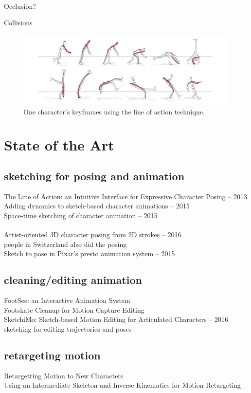 \documentclass[12pt, a4paper]{memoir}
\begin{document}
Occlusion?

Collisions

\begin{figure}
\includegraphics[scale=0.4]{img/baseline}
\caption{One character's keyframes using the line of action technique.}
\end{figure}

\section{State of the Art}
\subsection{sketching for posing and animation}
The Line of Action: an Intuitive Interface for Expressive Character Posing -- 2013\\
Adding dynamics to sketch-based character animations -- 2015\\
Space-time sketching of character animation -- 2015\\
\\
Artist-oriented 3D character posing from 2D strokes -- 2016\\
people in Switzerland also did the posing \\
Sketch to pose in Pixar's presto animation system -- 2015

\subsection{cleaning/editing animation}
FootSee: an Interactive Animation System\\
Footskate Cleanup for Motion Capture Editing\\
SketchiMo: Sketch-based Motion Editing for Articulated Characters -- 2016\\
sketching for editing trajectories and poses

\subsection{retargeting motion}
Retargetting Motion to New Characters\\
Using an Intermediate Skeleton and Inverse Kinematics for Motion Retargeting
\end{document}
